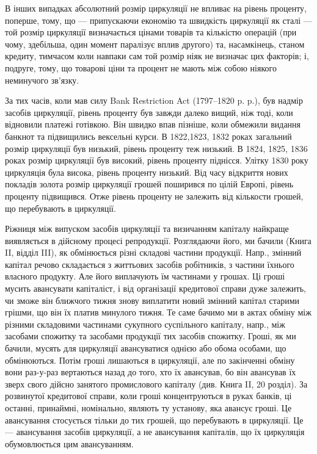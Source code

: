 
В інших випадках абсолютний розмір циркуляції не впливає на рівень
проценту, поперше, тому, що — припускаючи економію та швидкість циркуляції
як сталі — той розмір циркуляції визначається цінами товарів та кількістю операцій
(при чому, здебільша, один момент паралізує вплив другого) та, насамкінець,
станом кредиту, тимчасом коли навпаки сам той розмір ніяк не визначає
цих факторів; і, подруге, тому, що товарові ціни та процент не мають між собою
ніякого неминучого зв’язку.

За тих часів, коли мав силу Bank Restriction Act (1797--1820 p. p.),
був надмір засобів циркуляції, рівень проценту був завжди далеко вищий, ніж
тоді, коли відновили платежі готівкою. Він швидко впав пізніше, коли обмежили
видання банкнот та підвищились вексельні курси. В 1822,1823, 1832 роках
загальний розмір циркуляції був низький, рівень проценту теж низький. В 1824,
1825, 1836 роках розмір циркуляції був високий, рівень проценту піднісся.
Улітку 1830 року циркуляція була висока, рівень проценту низький. Від часу
відкриття нових покладів золота розмір циркуляції грошей поширився по цілій
Европі, рівень проценту підвищився. Отже рівень проценту не залежить від
кількости грошей, що перебувають в циркуляції.

Ріжниця між випуском засобів циркуляції та визичанням капіталу найкраще
виявляється в дійсному процесі репродукції. Розглядаючи його, ми бачили (Книга II,
відділ III), як обмінюється різні складові частини продукції. Напр., змінний капітал
речово складається з життьових засобів робітників, з частини їхнього власного
продукту. Але його виплачують їм частинами у грошах. Ці гроші мусить
авансувати капіталіст, і від організації кредитової справи дуже залежить, чи
зможе він ближчого тижня знову виплатити новий змінний капітал старими
грішми, що він їх платив минулого тижня. Те саме бачимо ми в актах обміну
між різними складовими частинами сукупного суспільного капіталу, напр., між
засобами спожитку та засобами продукції тих засобів спожитку. Гроші, як ми
бачили, мусять для циркуляції авансуватися однією або обома особами, що обмінюються.
Потім гроші лишаються в циркуляції, але по закінченні обміну вони
раз-у-раз вертаються назад до того, хто їх авансував, бо він авансував їх зверх
свого дійсно занятого промислового капіталу (див. Книга II, 20 розділ). За розвинутої
кредитової справи, коли гроші концентруються в руках банків, ці останні,
принаймні, номінально, являють ту установу, яка авансує гроші. Це авансування
стосується тільки до тих грошей, що перебувають в циркуляції. Це — авансування
засобів циркуляції, а не авансування капіталів, що їх циркуляція обумовлюється
цим авансуванням.

